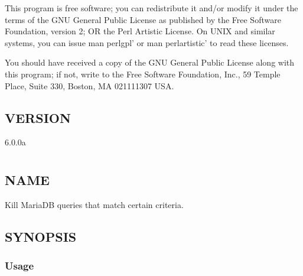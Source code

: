 \documentclass[letterpaper,10pt,english]{sphinxmanual}
\begin{document}
\sphinxAtStartPar
This program is free software; you can redistribute it and/or modify it under
the terms of the GNU General Public License as published by the Free Software
Foundation, version 2; OR the Perl Artistic License.  On UNIX and similar
systems, you can issue \textasciigrave{}man perlgpl’ or \textasciigrave{}man perlartistic’ to read these
licenses.

\sphinxAtStartPar
You should have received a copy of the GNU General Public License along with
this program; if not, write to the Free Software Foundation, Inc., 59 Temple
Place, Suite 330, Boston, MA  02111\sphinxhyphen{}1307  USA.


\section{VERSION}
\label{\detokenize{mariadb-iostat:version}}
\sphinxAtStartPar
{} 6.0.0a


\chapter{}
\label{\detokenize{mariadb-kill:mariadb-kill}}\label{\detokenize{mariadb-kill::doc}}

\section{NAME}
\label{\detokenize{mariadb-kill:name}}
\sphinxAtStartPar
{} \sphinxhyphen{} Kill MariaDB queries that match certain criteria.


\section{SYNOPSIS}
\label{\detokenize{mariadb-kill:synopsis}}

\subsection{Usage}
\label{\detokenize{mariadb-kill:usage}}
\begin{sphinxVerbatim}[commandchars=\\\{\}]
 \PYG{p}{[}\PYG{p}{]} \PYG{p}{[}\PYG{p}{]}
\end{sphinxVerbatim}
\end{document}
